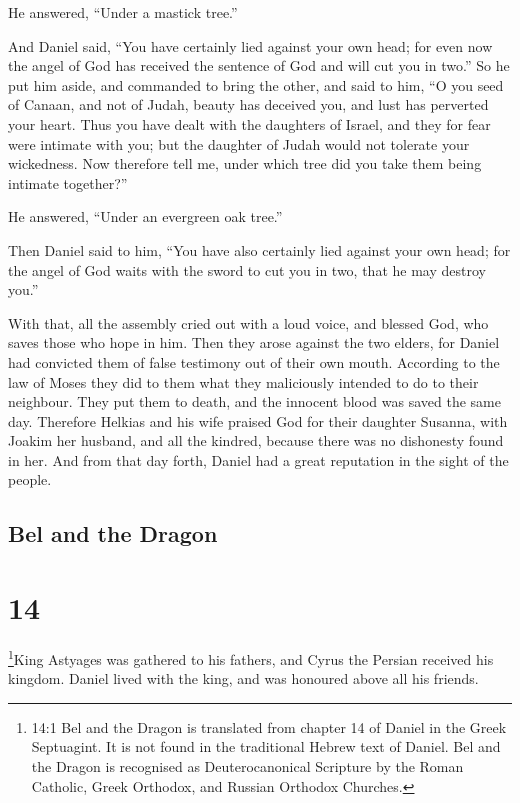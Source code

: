 He answered, ``Under a mastick tree.''

 And Daniel said, ``You have certainly lied against your
own head; for even now the angel of God has received the sentence of God
and will cut you in two.''  So he put him aside, and
commanded to bring the other, and said to him, ``O you seed of Canaan,
and not of Judah, beauty has deceived you, and lust has perverted your
heart.  Thus you have dealt with the daughters of Israel,
and they for fear were intimate with you; but the daughter of Judah
would not tolerate your wickedness.  Now therefore tell me,
under which tree did you take them being intimate together?''

He answered, ``Under an evergreen oak tree.''

 Then Daniel said to him, ``You have also certainly lied
against your own head; for the angel of God waits with the sword to cut
you in two, that he may destroy you.''

 With that, all the assembly cried out with a loud voice,
and blessed God, who saves those who hope in him.  Then
they arose against the two elders, for Daniel had convicted them of
false testimony out of their own mouth.  According to the
law of Moses they did to them what they maliciously intended to do to
their neighbour. They put them to death, and the innocent blood was
saved the same day.  Therefore Helkias and his wife praised
God for their daughter Susanna, with Joakim her husband, and all the
kindred, because there was no dishonesty found in her.  And
from that day forth, Daniel had a great reputation in the sight of the
people.

\hypertarget{bel-and-the-dragon}{%
\subsection{Bel and the Dragon}\label{bel-and-the-dragon}}

\hypertarget{section-13}{%
\section{14}\label{section-13}}

 \footnote{14:1 Bel and the Dragon is translated from
  chapter 14 of Daniel in the Greek Septuagint. It is not found in the
  traditional Hebrew text of Daniel. Bel and the Dragon is recognised as
  Deuterocanonical Scripture by the Roman Catholic, Greek Orthodox, and
  Russian Orthodox Churches.}King Astyages was gathered to his fathers,
and Cyrus the Persian received his kingdom.  Daniel lived
with the king, and was honoured above all his friends.

